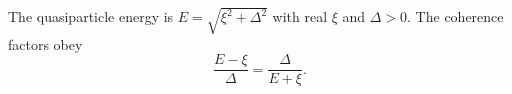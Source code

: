 \documentclass{article}
\begin{document}
The quasiparticle energy is $E = \sqrt{\xi^2+\Delta^2}$ with real $\xi$ and $\Delta>0$.
The coherence factors obey
\begin{equation}
\frac{E-\xi}{\Delta} = \frac{\Delta}{E+\xi} .
\label{eq:coh}
\end{equation}
\end{document}
